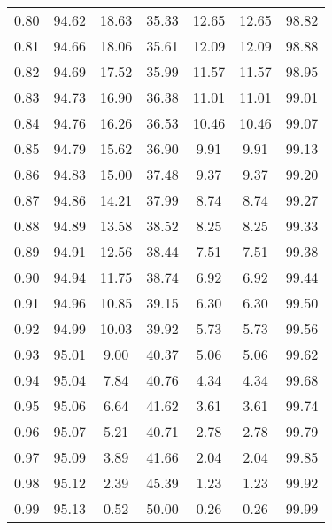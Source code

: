 \begin{tabular}{|c|c|c|c|c|c|c|}
      0.80 &     94.62 &     18.63 &      35.33 &   12.65 &      12.65 &         98.82 \\
      0.81 &     94.66 &     18.06 &      35.61 &   12.09 &      12.09 &         98.88 \\
      0.82 &     94.69 &     17.52 &      35.99 &   11.57 &      11.57 &         98.95 \\
      0.83 &     94.73 &     16.90 &      36.38 &   11.01 &      11.01 &         99.01 \\
      0.84 &     94.76 &     16.26 &      36.53 &   10.46 &      10.46 &         99.07 \\
      0.85 &     94.79 &     15.62 &      36.90 &    9.91 &       9.91 &         99.13 \\
      0.86 &     94.83 &     15.00 &      37.48 &    9.37 &       9.37 &         99.20 \\
      0.87 &     94.86 &     14.21 &      37.99 &    8.74 &       8.74 &         99.27 \\
      0.88 &     94.89 &     13.58 &      38.52 &    8.25 &       8.25 &         99.33 \\
      0.89 &     94.91 &     12.56 &      38.44 &    7.51 &       7.51 &         99.38 \\
      0.90 &     94.94 &     11.75 &      38.74 &    6.92 &       6.92 &         99.44 \\
      0.91 &     94.96 &     10.85 &      39.15 &    6.30 &       6.30 &         99.50 \\
      0.92 &     94.99 &     10.03 &      39.92 &    5.73 &       5.73 &         99.56 \\
      0.93 &     95.01 &      9.00 &      40.37 &    5.06 &       5.06 &         99.62 \\
      0.94 &     95.04 &      7.84 &      40.76 &    4.34 &       4.34 &         99.68 \\
      0.95 &     95.06 &      6.64 &      41.62 &    3.61 &       3.61 &         99.74 \\
      0.96 &     95.07 &      5.21 &      40.71 &    2.78 &       2.78 &         99.79 \\
      0.97 &     95.09 &      3.89 &      41.66 &    2.04 &       2.04 &         99.85 \\
      0.98 &     95.12 &      2.39 &      45.39 &    1.23 &       1.23 &         99.92 \\
      0.99 &     95.13 &      0.52 &      50.00 &    0.26 &       0.26 &         99.99 \\
\bottomrule
\end{tabular}
